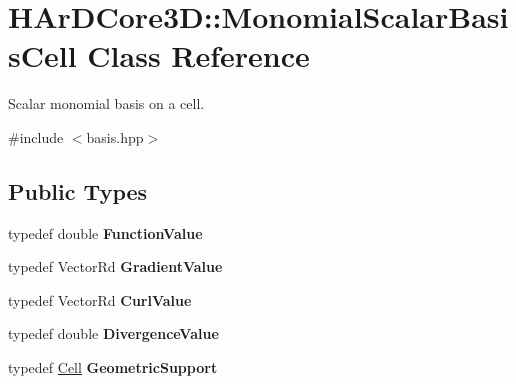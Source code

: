 \hypertarget{classHArDCore3D_1_1MonomialScalarBasisCell}{}\section{H\+Ar\+D\+Core3D\+:\+:Monomial\+Scalar\+Basis\+Cell Class Reference}
\label{classHArDCore3D_1_1MonomialScalarBasisCell}


Scalar monomial basis on a cell.  




{\ttfamily \#include $<$basis.\+hpp$>$}

\subsection*{Public Types}
\begin{DoxyCompactItemize}
\item 
\mbox{\label{classHArDCore3D_1_1MonomialScalarBasisCell_a7ee03d626d3f1844ca9e7a2273cbf060}} 
typedef double {\bfseries Function\+Value}
\item 
\mbox{\label{classHArDCore3D_1_1MonomialScalarBasisCell_ac69e8499d538f283ebbd66aea3ed60ce}} 
typedef Vector\+Rd {\bfseries Gradient\+Value}
\item 
\mbox{\label{classHArDCore3D_1_1MonomialScalarBasisCell_a51dab214529fd96b8930aeb99f94ea6f}} 
typedef Vector\+Rd {\bfseries Curl\+Value}
\item 
\mbox{\label{classHArDCore3D_1_1MonomialScalarBasisCell_a0f45b77fbbfa51f5e5aca7c90f837e05}} 
typedef double {\bfseries Divergence\+Value}
\item 
\mbox{\label{classHArDCore3D_1_1MonomialScalarBasisCell_af1fb25612ece0a8d033134f47b5d82a4}} 
typedef \hyperlink{classHArDCore3D_1_1Cell}{Cell} {\bfseries Geometric\+Support}
\end{DoxyCompactItemize}
